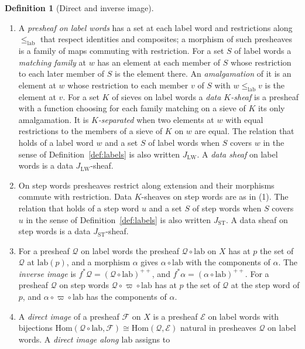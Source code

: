 \documentclass{lmcs}
\theoremstyle{definition}
\newtheorem{definition}[theorem]{Definition}
\theoremstyle{remark}
\newcommand{\JLW}{J_{\LW}}
\newcommand{\lab}{\mathrm{lab}}
\newcommand{\lle}{\leq_{\mathrm{lab}}}
\newcommand{\LW}{\mathrm{LW}}
\providecommand{\lab}{\mathrm{lab}}
\providecommand{\JSW}{J_{\mathrm{ST}}}
\providecommand{\fgt}{\varpi}
\providecommand{\fin}{f^{\ast}}
\begin{document}
\begin{definition}[Direct and inverse image]\label{def:label-images}
\begin{enumerate}
\item A \emph{presheaf on label words} has a set at each label word and restrictions along $\lle$ that respect
  identities and composites; a morphism of such presheaves is a family of maps commuting with
  restriction. For a set $S$ of label words a \emph{matching family} at $w$ has an element at each
  member of $S$ whose restriction to each later member of $S$ is the element there. An
  \emph{amalgamation} of it is an element at $w$ whose restriction to each member $v$ of $S$ with $w\lle v$ is the
  element at $v$. For a set $K$ of sieves on label words a \emph{data $K$-sheaf} is a presheaf
  with a function choosing for each family matching on a sieve of $K$ its only amalgamation. It is \emph{$K$-separated} when two elements at $w$ with equal restrictions to the
  members of a sieve of $K$ on $w$ are equal. The relation that holds of a label word $w$ and a set $S$ of label words when $S$
  covers $w$ in the sense of Definition~\ref{def:labels} is also written $\JLW$. A \emph{data sheaf} on label words is a data $\JLW$-sheaf.
\item On step words presheaves restrict along extension and their morphisms commute with
  restriction. Data $K$-sheaves on step words are as in (1). The relation that holds of a step word $u$ and a set $S$ of step words when $S$ covers $u$ in the sense of
  Definition~\ref{def:labels} is also written $\JSW$. A data sheaf on step
  words is a data $\JSW$-sheaf.
\item For a presheaf $\mathscr{Q}$ on label words the presheaf $\mathscr{Q}\circ\lab$ on $X$ has at $p$ the set of
  $\mathscr{Q}$ at $\lab(p)$, and a morphism $\alpha$ gives $\alpha\circ\lab$ with the components
  of $\alpha$. The \emph{inverse image} is $\fin\mathscr{Q}=(\mathscr{Q}\circ\lab)^{++}$,
  and $\fin\alpha=(\alpha\circ\lab)^{++}$. For a presheaf
  $\mathscr{Q}$ on step words $\mathscr{Q}\circ\fgt\circ\lab$ has at $p$ the set of $\mathscr{Q}$ at the step word of
  $p$, and $\alpha\circ\fgt\circ\lab$ has the components of $\alpha$.
\item A \emph{direct image} of a presheaf $\mathscr{F}$ on $X$ is a presheaf $\mathscr{E}$ on label words with
  bijections $\mathrm{Hom}(\mathscr{Q}\circ\lab,\mathscr{F})\cong\mathrm{Hom}(\mathscr{Q},\mathscr{E})$ natural in
  presheaves $\mathscr{Q}$ on label words. A \emph{direct image along $\lab$} assigns to

\end{enumerate}
\end{definition}
\end{document}
